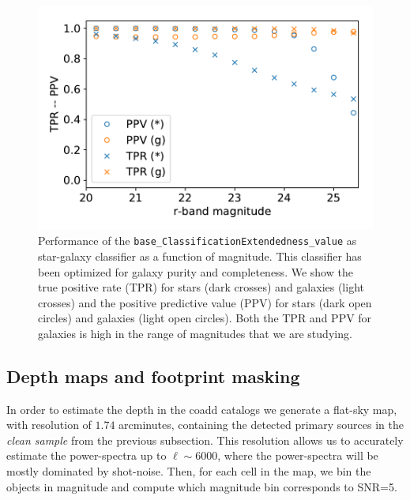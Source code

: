\documentclass[\docopts]{\docclass}
\begin{document}
\begin{figure}
\centering
\includegraphics[width=0.9\columnwidth]{stellar_contamination_v2}
\caption{Performance of the \texttt{base\_ClassificationExtendedness\_value} as star-galaxy classifier as a function of magnitude. This classifier has been optimized for galaxy purity and completeness. We show the true positive rate (TPR) for stars (dark crosses) and galaxies (light crosses) and the positive predictive value (PPV) for stars (dark open circles) and galaxies (light open circles). Both the TPR and PPV for galaxies is high in the range of magnitudes that we are studying.}
\label{fig:star_galaxy_separation}
\end{figure}
\subsection{Depth maps and footprint masking}
\label{sec:masking}

In order to estimate the depth in the coadd catalogs we generate a flat-sky map, with resolution of $1.74$ arcminutes, containing the detected primary sources in the \textit{clean sample} from the previous subsection. This resolution allows us to accurately estimate the power-spectra up to $\ell \sim 6000$, where the power-spectra will be mostly dominated by shot-noise. Then, for each cell in the map, we bin the objects in magnitude and compute which magnitude bin corresponds to SNR=5.
\end{document}
